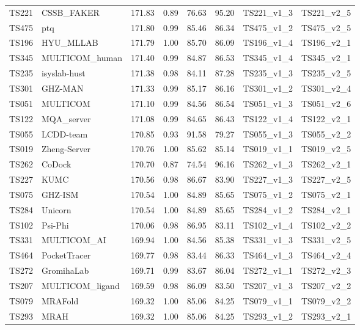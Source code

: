 \begin{table}[ht]
{\begin{tabular}{llllllll}
TS221 & CSSB\_FAKER & 171.83 & 0.89 & 76.63 & 95.20 & TS221\_v1\_3 & TS221\_v2\_5 \\ 
TS475 & ptq & 171.80 & 0.99 & 85.46 & 86.34 & TS475\_v1\_2 & TS475\_v2\_5 \\ 
TS196 & HYU\_MLLAB & 171.79 & 1.00 & 85.70 & 86.09 & TS196\_v1\_4 & TS196\_v2\_1 \\ 
TS345 & MULTICOM\_human & 171.40 & 0.99 & 84.87 & 86.53 & TS345\_v1\_4 & TS345\_v2\_1 \\ 
TS235 & isyslab-hust & 171.38 & 0.98 & 84.11 & 87.28 & TS235\_v1\_3 & TS235\_v2\_5 \\ 
TS301 & GHZ-MAN & 171.33 & 0.99 & 85.17 & 86.16 & TS301\_v1\_2 & TS301\_v2\_4 \\ 
TS051 & MULTICOM & 171.10 & 0.99 & 84.56 & 86.54 & TS051\_v1\_3 & TS051\_v2\_6 \\ 
TS122 & MQA\_server & 171.08 & 0.99 & 84.65 & 86.43 & TS122\_v1\_4 & TS122\_v2\_1 \\ 
TS055 & LCDD-team & 170.85 & 0.93 & 91.58 & 79.27 & TS055\_v1\_3 & TS055\_v2\_2 \\ 
TS019 & Zheng-Server & 170.76 & 1.00 & 85.62 & 85.14 & TS019\_v1\_1 & TS019\_v2\_5 \\ 
TS262 & CoDock & 170.70 & 0.87 & 74.54 & 96.16 & TS262\_v1\_3 & TS262\_v2\_1 \\ 
TS227 & KUMC & 170.56 & 0.98 & 86.67 & 83.90 & TS227\_v1\_3 & TS227\_v2\_5 \\ 
TS075 & GHZ-ISM & 170.54 & 1.00 & 84.89 & 85.65 & TS075\_v1\_2 & TS075\_v2\_1 \\ 
TS284 & Unicorn & 170.54 & 1.00 & 84.89 & 85.65 & TS284\_v1\_2 & TS284\_v2\_1 \\ 
TS102 & Psi-Phi & 170.06 & 0.98 & 86.95 & 83.11 & TS102\_v1\_4 & TS102\_v2\_2 \\ 
TS331 & MULTICOM\_AI & 169.94 & 1.00 & 84.56 & 85.38 & TS331\_v1\_3 & TS331\_v2\_5 \\ 
TS464 & PocketTracer & 169.77 & 0.98 & 83.44 & 86.33 & TS464\_v1\_3 & TS464\_v2\_4 \\ 
TS272 & GromihaLab & 169.71 & 0.99 & 83.67 & 86.04 & TS272\_v1\_1 & TS272\_v2\_3 \\ 
TS207 & MULTICOM\_ligand & 169.59 & 0.98 & 86.09 & 83.50 & TS207\_v1\_3 & TS207\_v2\_2 \\ 
TS079 & MRAFold & 169.32 & 1.00 & 85.06 & 84.25 & TS079\_v1\_1 & TS079\_v2\_2 \\ 
TS293 & MRAH & 169.32 & 1.00 & 85.06 & 84.25 & TS293\_v1\_2 & TS293\_v2\_1 \\ 

\end{tabular}}
\end{table}
